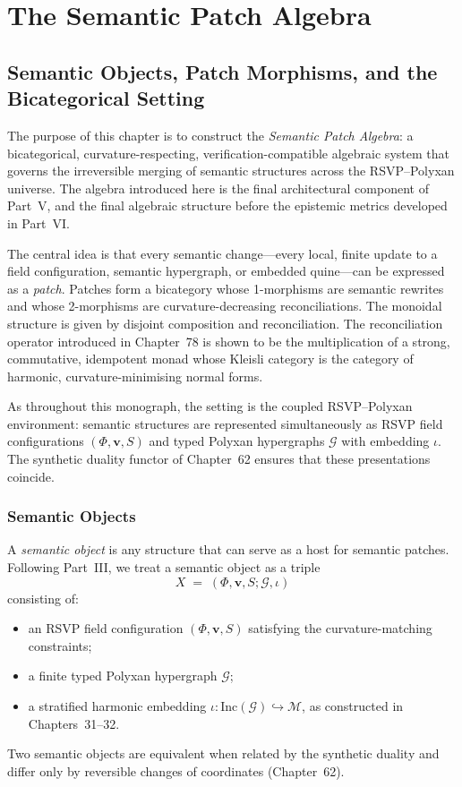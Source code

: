\chapter{The Semantic Patch Algebra}
\label{ch:79}

\section{Semantic Objects, Patch Morphisms, and the Bicategorical Setting}
\label{sec:79-1}

The purpose of this chapter is to construct the \emph{Semantic Patch Algebra}:
a bicategorical, curvature-respecting, verification-compatible algebraic system
that governs the irreversible merging of semantic structures across the RSVP--Polyxan universe.
The algebra introduced here is the final architectural component of Part~V,
and the final algebraic structure before the epistemic metrics developed in Part~VI.

The central idea is that every semantic change---every local, finite update to a field configuration,
semantic hypergraph, or embedded quine---can be expressed as a \emph{patch}.
Patches form a bicategory whose 1-morphisms are semantic rewrites
and whose 2-morphisms are curvature-decreasing reconciliations.
The monoidal structure is given by disjoint composition and reconciliation.
The reconciliation operator introduced in Chapter~78 is shown to be the multiplication of a strong,
commutative, idempotent monad whose Kleisli category is the category of harmonic,
curvature-minimising normal forms.

As throughout this monograph, the setting is the coupled RSVP--Polyxan environment:
semantic structures are represented simultaneously as
RSVP field configurations $(\Phi,\mathbf{v},S)$
and typed Polyxan hypergraphs $\mathcal{G}$ with embedding $\iota$.
The synthetic duality functor of Chapter~62 ensures that these presentations coincide.

\subsection{Semantic Objects}
\label{subsec:79-1-semantic-objects}

A \emph{semantic object} is any structure that can serve as a host for semantic patches.
Following Part~III, we treat a semantic object as a triple
\[
X \;=\; (\Phi,\mathbf{v},S;\mathcal{G},\iota)
\]
consisting of:
\begin{itemize}
\item an RSVP field configuration $(\Phi,\mathbf{v},S)$ satisfying the curvature-matching constraints;
\item a finite typed Polyxan hypergraph $\mathcal{G}$;
\item a stratified harmonic embedding $\iota:\mathrm{Inc}(\mathcal{G})\hookrightarrow\mathcal{M}$,
      as constructed in Chapters~31--32.
\end{itemize}
Two semantic objects are equivalent when related by the synthetic duality
and differ only by reversible changes of coordinates (Chapter~62).

